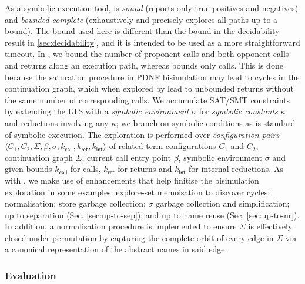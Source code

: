 As a symbolic execution tool, \SLHobbit{} is \textit{sound} (reports only true positives and negatives) and \textit{bounded-complete} (exhaustively and precisely explores all paths up to a bound). {The bound used here is different than the bound in the decidability result in \cref{sec:decidability}, and it is intended to be used as a more straightforward timeout.} In \SLHobbit{}, we bound the number of proponent calls and both opponent calls and returns along an execution path, whereas \Hobbit{} bounds only calls. This is done because {the saturation procedure in PDNF bisimulation may lead to cycles in the continuation graph, which when explored by \SLHobbit{} lead to unbounded returns without the same number of corresponding calls}. We accumulate SAT/SMT constraints by extending the LTS with a \textit{symbolic environment} $\sigma$ for \textit{symbolic constants} $\kappa$ and reductions involving any $\kappa$; we branch on symbolic conditions as is standard of symbolic execution.
The exploration is performed over \textit{configuration pairs} $\langle C_1, C_2, \Sigma, \beta, \sigma, k_{\textsf{call}} , k_{\textsf{ret}} , k_{\textsf{int}} \rangle$ of related term configurations $C_1$ and $C_2$, continuation graph $\Sigma$, current call entry point $\beta$, {symbolic environment $\sigma$} and given bounds $k_{\textsf{call}}$ for calls, $k_{\textsf{ret}}$ for returns and $k_{\textsf{int}}$ for internal reductions.
As with \Hobbit{}, we make use of enhancements that help finitise the bisimulation exploration in some examples: explore-set memoisation {to discover cycles}; normalisation; store garbage collection; $\sigma$ garbage collection and simplification; up to separation (Sec. \ref{sec:up-to-sep}); and up to name reuse (Sec. \ref{sec:up-to-nr}). In addition, a normalisation procedure is implemented to ensure $\Sigma$ is effectively closed under permutation by capturing the complete orbit of every edge in $\Sigma$ via a canonical representation of the abstract names in said edge.

\subsubsection{Evaluation}
\newcommand{\titleAC}{\multicolumn{1}{@{\;\quad}c@{\;\quad}}{PDNF}}
\newcommand{\titleB}{\multicolumn{1}{c}{\Hobbit{}}}
\newcommand{\titleC}{\multicolumn{1}{c|}{H+reentry}}
\newcommand{\titleE}{\multicolumn{1}{c|}{\Hobbit{}}}
\newcommand{\tabitem}{~~\llap{\textbullet}~~}

